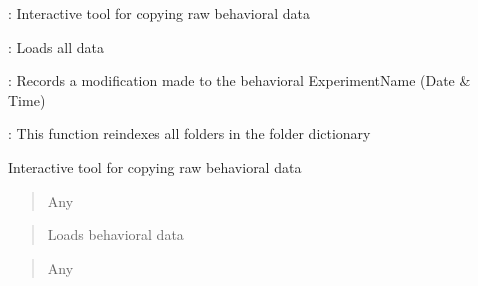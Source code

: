 \documentclass[letterpaper,10pt,english]{sphinxmanual}
\begin{document}
\begin{fulllineitems}
\begin{description}
\begin{DUlineblock}{0em}
\item[]  : Interactive tool for copying raw behavioral data
\item[]  : Loads all data
\item[]  :  Records a modification made to the behavioral ExperimentName (Date \& Time)
\item[]  : This function re\sphinxhyphen{}indexes all folders in the folder dictionary
\end{DUlineblock}

\end{description}

\begin{fulllineitems}
\label{\detokenize{Organization:Organization.BehavioralExperiment.copy_raw_behavioral_data}}
\pysigstartsignatures
{}
\pysigstopsignatures
\sphinxAtStartPar
Interactive tool for copying raw behavioral data
\begin{quote}\begin{description}
\sphinxAtStartPar
Any

\end{description}\end{quote}

\end{fulllineitems}


\begin{fulllineitems}
\label{\detokenize{Organization:Organization.BehavioralExperiment.load_data}}
\pysigstartsignatures
{}
\pysigstopsignatures\begin{quote}

\sphinxAtStartPar
Loads behavioral data
\end{quote}
\begin{quote}\begin{description}
\sphinxAtStartPar
Any

\end{description}\end{quote}

\end{fulllineitems}


\end{fulllineitems}
\end{document}

